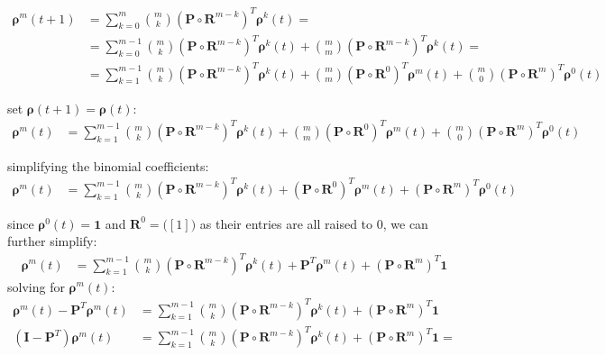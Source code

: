 \documentclass[\main/main.tex]{subfiles}
\begin{document}
\begin{equation}
\begin{split}
\bm{\rho}^m(t+1) &= \sum_{k=0}^{m} {m \choose k} (\mathbf{P} \circ \mathbf{R}^{m-k}) ^ T \bm{\rho}^k(t) =\\
&= \sum_{k=0}^{m-1} {m \choose k} (\mathbf{P} \circ \mathbf{R}^{m-k}) ^ T \bm{\rho}^k(t) +  {m \choose m} (\mathbf{P} \circ \mathbf{R}^{m-k}) ^ T \bm{\rho}^k(t) =\\
&=  \sum_{k=1}^{m-1} {m \choose k} (\mathbf{P} \circ \mathbf{R}^{m-k}) ^ T \bm{\rho}^k(t) +
     {m \choose m} (\mathbf{P} \circ \mathbf{R}^{0}) ^ T \bm{\rho}^m(t) +  {m \choose 0} (\mathbf{P} \circ \mathbf{R}^{m}) ^ T \bm{\rho}^0(t)
\end{split}
    \end{equation}

set $\bm{\rho}(t+1) = \bm{\rho}(t)$:\\
\begin{equation}
\begin{split}
\bm{\rho}^m(t) &=  \sum_{k=1}^{m-1} {m \choose k} (\mathbf{P} \circ \mathbf{R}^{m-k}) ^ T \bm{\rho}^k(t) +
     {m \choose m} (\mathbf{P} \circ \mathbf{R}^{0}) ^ T \bm{\rho}^m(t) +  {m \choose 0} (\mathbf{P} \circ \mathbf{R}^{m}) ^ T \bm{\rho}^0(t)
\end{split}
\end{equation}

simplifying the binomial coefficients:\\
\begin{equation}
\begin{split}
\bm{\rho}^m(t) &=  \sum_{k=1}^{m-1} {m \choose k} (\mathbf{P} \circ \mathbf{R}^{m-k}) ^ T \bm{\rho}^k(t) +
     (\mathbf{P} \circ \mathbf{R}^{0}) ^ T \bm{\rho}^m(t) + (\mathbf{P} \circ \mathbf{R}^{m}) ^ T \bm{\rho}^0(t)
\end{split}
\end{equation}

since $\bm{\rho}^0(t) = \bm{1}$ and $\mathbf{R}^0 = \big ([1]\big)$ as their entries are all raised to $0$, we can further simplify:\\
\begin{equation}\label{mom}
\begin{split}
     \bm{\rho}^m(t) &= 
     \sum_{k=1}^{m-1} {m \choose k} (\mathbf{P} \circ \mathbf{R}^{m-k}) ^ T \bm{\rho}^k(t) +
     \mathbf{P} ^ T \bm{\rho}^m(t) + (\mathbf{P} \circ \mathbf{R}^{m}) ^ T \bm{1}
\end{split}
    \end{equation}
solving for $\bm{\rho}^m(t)$:    
\begin{equation}
\begin{split}
     \bm{\rho}^m(t) - \mathbf{P} ^ T \bm{\rho}^m(t) &= 
     \sum_{k=1}^{m-1} {m \choose k} (\mathbf{P} \circ \mathbf{R}^{m-k}) ^ T \bm{\rho}^k(t)
     + (\mathbf{P} \circ \mathbf{R}^{m}) ^ T \bm{1}\\
     ( \mathbf{I} - \mathbf{P}^T)  \bm{\rho}^m(t) &= 
     \sum_{k=1}^{m-1} {m \choose k} (\mathbf{P} \circ \mathbf{R}^{m-k}) ^ T \bm{\rho}^k(t)
     + (\mathbf{P} \circ \mathbf{R}^{m}) ^ T \bm{1} = 
\end{split}
    \end{equation}
\end{document}
